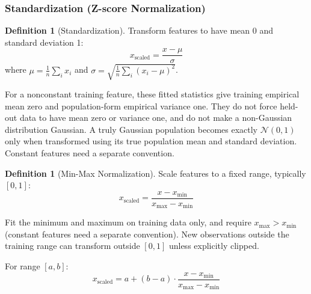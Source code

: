 \documentclass[11pt,twoside]{article}
\numberwithin{equation}{section}
\theoremstyle{plain}
\theoremstyle{definition}
\newtheorem{definition}[theorem]{Definition}
\theoremstyle{remark}
\begin{document}
\subsubsection{Standardization (Z-score Normalization)}

\begin{definition}[Standardization]
Transform features to have mean 0 and standard deviation 1:
\[
x_{\text{scaled}} = \frac{x - \mu}{\sigma}
\]
where $\mu = \frac{1}{n}\sum_i x_i$ and $\sigma = \sqrt{\frac{1}{n}\sum_i (x_i - \mu)^2}$.

For a nonconstant training feature, these fitted statistics give training empirical mean zero and population-form empirical variance one. They do not force held-out data to have mean zero or variance one, and do not make a non-Gaussian distribution Gaussian. A truly Gaussian population becomes exactly $\mathcal N(0,1)$ only when transformed using its true population mean and standard deviation. Constant features need a separate convention.
\end{definition}

\begin{definition}[Min-Max Normalization]
Scale features to a fixed range, typically $[0, 1]$:
\[
x_{\text{scaled}} = \frac{x - x_{\min}}{x_{\max} - x_{\min}}
\]

Fit the minimum and maximum on training data only, and require $x_{\max}>x_{\min}$ (constant features need a separate convention). New observations outside the training range can transform outside $[0,1]$ unless explicitly clipped.

For range $[a,b]$:
\[
x_{\text{scaled}} = a + (b - a) \cdot \frac{x - x_{\min}}{x_{\max} - x_{\min}}
\]
\end{definition}
\end{document}
